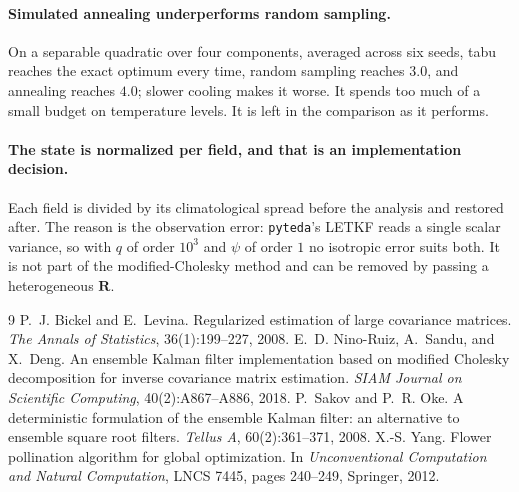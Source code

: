\documentclass[11pt,a4paper]{article}
\theoremstyle{definition}
\newcommand{\Rmat}{\mathbf{R}}
\begin{document}
\paragraph{Simulated annealing underperforms random sampling.}
On a separable quadratic over four components, averaged across six seeds, tabu
reaches the exact optimum every time, random sampling reaches $3.0$, and
annealing reaches $4.0$; slower cooling makes it worse. It spends too much of a
small budget on temperature levels. It is left in the comparison as it
performs.

\paragraph{The state is normalized per field, and that is an implementation
decision.} Each field is divided by its climatological spread before the
analysis and restored after. The reason is the observation error: \texttt{pyteda}'s
LETKF reads a single scalar variance, so with $q$ of order $10^{3}$ and $\psi$
of order $1$ no isotropic error suits both. It is not part of the
modified-Cholesky method and can be removed by passing a heterogeneous $\Rmat$.

\begin{thebibliography}{9}
 P.~J. Bickel and E.~Levina.
  Regularized estimation of large covariance matrices.
  \emph{The Annals of Statistics}, 36(1):199--227, 2008.
 E.~D. Nino-Ruiz, A.~Sandu, and X.~Deng.
  An ensemble Kalman filter implementation based on modified Cholesky
  decomposition for inverse covariance matrix estimation.
  \emph{SIAM Journal on Scientific Computing}, 40(2):A867--A886, 2018.
 P.~Sakov and P.~R. Oke.
  A deterministic formulation of the ensemble Kalman filter: an alternative to
  ensemble square root filters. \emph{Tellus A}, 60(2):361--371, 2008.
 X.-S. Yang.
  Flower pollination algorithm for global optimization.
  In \emph{Unconventional Computation and Natural Computation}, LNCS 7445,
  pages 240--249, Springer, 2012.
\end{thebibliography}
\end{document}
